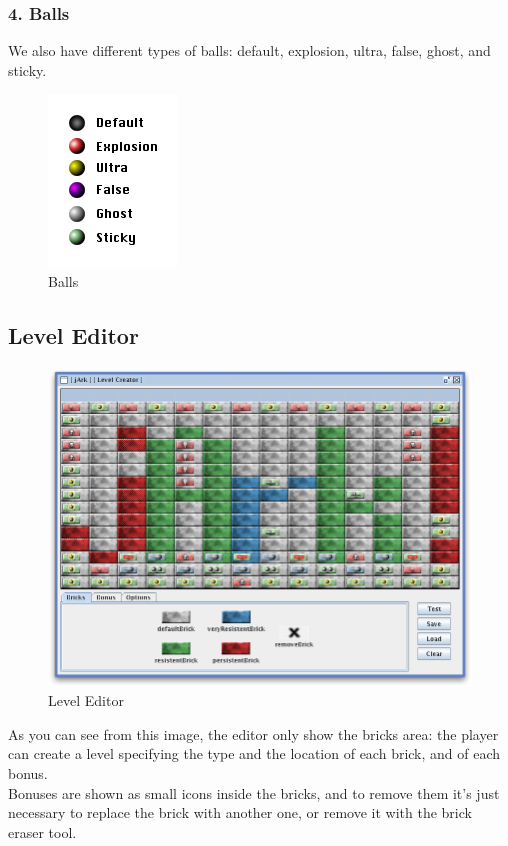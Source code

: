 \documentclass[12pt]{article}
\begin{document}
\subsubsection*{4. Balls}
We also have different types of balls: default, explosion, ultra, false, ghost, and sticky.
\begin{figure}[htbp]
  \centering
    \includegraphics[scale=0.7]{balls.png}
  \caption{Balls}
  \label{buddies}
\end{figure}

\newpage
\subsection{Level Editor}
\begin{figure}[htbp]
  \centering
    \includegraphics[scale=0.5]{editor.png}
  \caption{Level Editor}
  \label{buddies}
\end{figure}

As you can see from this image, the editor only show the bricks area: the player can create a level specifying the type and the location of each brick, and of each bonus.\\
Bonuses are shown as small icons inside the bricks, and to remove them it's just necessary to replace the brick with another one, or remove it with the brick eraser tool.\\
\end{document}
